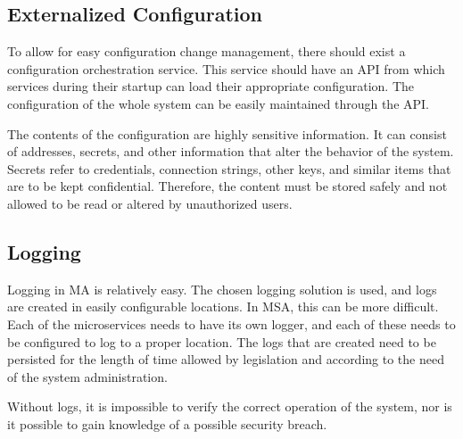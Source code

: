 \subsection{Externalized Configuration}
\begin{sloppypar}
    To allow for easy configuration change management, there should exist a
    configuration orchestration service. This service should have an API from
    which services during their startup can load their appropriate configuration.
    The configuration of the whole system can be easily maintained through the
    API.
\end{sloppypar}
\begin{sloppypar}
    The contents of the configuration are highly sensitive information. It can
    consist of addresses, secrets, and other information that alter the behavior
    of the system. Secrets refer to credentials, connection strings, other keys,
    and similar items that are to be kept confidential. Therefore, the content
    must be stored safely and not allowed to be read or altered by unauthorized
    users.
\end{sloppypar}

\subsection{Logging}
\begin{sloppypar}
    Logging in MA is relatively easy. The chosen logging solution is used, and
    logs are created in easily configurable locations. In MSA, this can be more
    difficult. Each of the microservices needs to have its own logger, and each
    of these needs to be configured to log to a proper location. The logs that
    are created need to be persisted for the length of time allowed by
    legislation and according to the need of the system administration.
\end{sloppypar}
\begin{sloppypar}
    Without logs, it is impossible to verify the correct operation of the system, nor
    is it possible to gain knowledge of a possible security breach. 
\end{sloppypar}

